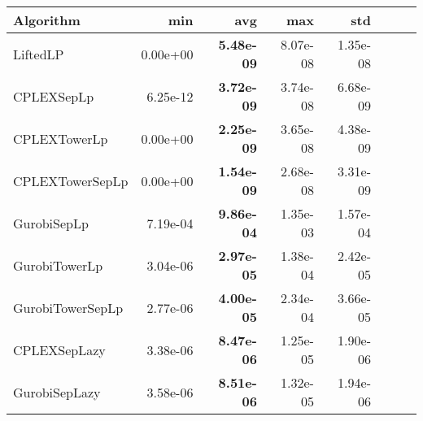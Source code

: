 \begin{tabular}{lrrrrrrr}
Algorithm & min & avg & max & std
\\
\hline
LiftedLP&0.00e+00& \bf5.48e-09& 8.07e-08& 1.35e-08\\
CPLEXSepLp&6.25e-12& \bf3.72e-09& 3.74e-08& 6.68e-09\\
CPLEXTowerLp&0.00e+00& \bf2.25e-09& 3.65e-08& 4.38e-09\\
CPLEXTowerSepLp&0.00e+00& \bf1.54e-09& 2.68e-08& 3.31e-09\\
GurobiSepLp&7.19e-04& \bf9.86e-04& 1.35e-03& 1.57e-04\\
GurobiTowerLp&3.04e-06& \bf2.97e-05& 1.38e-04& 2.42e-05\\
GurobiTowerSepLp&2.77e-06& \bf4.00e-05& 2.34e-04& 3.66e-05\\
CPLEXSepLazy&3.38e-06& \bf8.47e-06& 1.25e-05& 1.90e-06\\
GurobiSepLazy&3.58e-06& \bf8.51e-06& 1.32e-05& 1.94e-06
\end{tabular}

